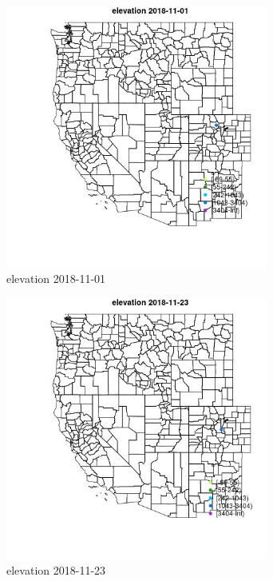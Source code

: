 \begin{figure} 
\centering  
\includegraphics[width=0.77\textwidth]{Code_Outputs/Report_ML_input_PM25_Step4_part_e_de_duplicated_aves_MapObselevation2018-11-01.jpg} 
\caption{\label{fig:Report_ML_input_PM25_Step4_part_e_de_duplicated_avesMapObselevation2018-11-01}elevation 2018-11-01} 
\end{figure} 
 

\clearpage 

\begin{figure} 
\centering  
\includegraphics[width=0.77\textwidth]{Code_Outputs/Report_ML_input_PM25_Step4_part_e_de_duplicated_aves_MapObselevation2018-11-23.jpg} 
\caption{\label{fig:Report_ML_input_PM25_Step4_part_e_de_duplicated_avesMapObselevation2018-11-23}elevation 2018-11-23} 
\end{figure} 
 

